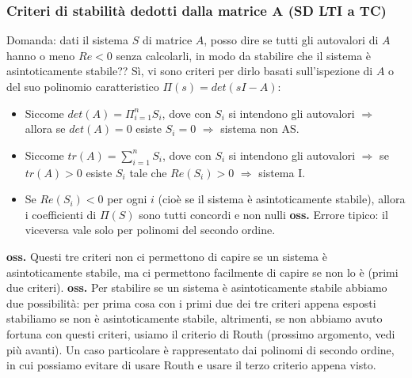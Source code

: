\subsubsection{Criteri di stabilità dedotti dalla matrice A (SD LTI a TC)}
Domanda: dati il sistema $S$ di matrice $A$, posso dire se tutti gli autovalori di $A$ hanno o meno $Re <0$ senza calcolarli, in modo da stabilire che il sistema è asintoticamente stabile??\newline
\newline
Sì, vi sono criteri per dirlo basati sull'ispezione di $A$ o del suo polinomio caratteristico $\Pi(s) = det (sI-A)$:
\begin{itemize}
    \item Siccome $det(A) = \Pi_{i=1}^{n}S_i$, dove con $S_i$ si intendono gli autovalori $\Longrightarrow$ allora se $det(A) = 0$ esiste $S_i = 0$ $\Longrightarrow$ sistema non AS.
    \item Siccome $tr(A) = \sum_{i=1}^{n}S_i$, dove con $S_i$ si intendono gli autovalori $\Longrightarrow$ se $tr(A) >0$ esiste $S_i$ tale che $Re(S_i) > 0$ $\Longrightarrow$ sistema I.
    \item Se $Re(S_i)<0$ per ogni $i$ (cioè se il sistema è asintoticamente stabile), allora i coefficienti di $\Pi(S)$ sono tutti concordi e non nulli \newline
    \textbf{oss.} Errore tipico: il viceversa vale solo per polinomi del secondo ordine.
\end{itemize}
\textbf{oss.}  Questi tre criteri non ci permettono di capire se un sistema è asintoticamente stabile, ma ci permettono facilmente di capire se non lo è (primi due criteri).\newline
\newline
\textbf{oss.} Per stabilire se un sistema è asintoticamente stabile abbiamo due possibilità: per prima cosa con i primi due dei tre criteri appena esposti stabiliamo se non è asintoticamente stabile, altrimenti, se non abbiamo avuto fortuna con questi criteri, usiamo il criterio di Routh (prossimo argomento, vedi più avanti). Un caso particolare è rappresentato dai polinomi di secondo ordine, in cui possiamo evitare di usare Routh e usare il terzo criterio appena visto.
